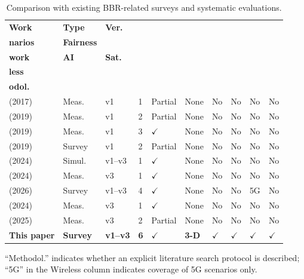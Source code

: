 \documentclass[a4paper,fleqn]{cas-sc}
\begin{document}
\begin{table}[pos=tbp]
  \caption{Comparison with existing BBR-related surveys and systematic evaluations.}
  \label{tab:survey_compare}
  \footnotesize
  \setlength{\tabcolsep}{3pt}
  \begin{tabularx}{\tblwidth}{@{}p{3.2cm}p{1.4cm}p{1.1cm}p{0.9cm}p{1.0cm}p{1.2cm}p{0.55cm}p{0.55cm}p{0.9cm}p{1.1cm}@{}}
    \toprule
    \textbf{Work} & \textbf{Type} & \textbf{Ver.} & \makecell[l]{\textbf{Sce-}\\\textbf{narios}}
      & \textbf{Fairness} & \makecell[l]{\textbf{Frame-}\\\textbf{work}} & \textbf{AI} & \textbf{Sat.}
      & \makecell[l]{\textbf{Wire-}\\\textbf{less}} & \makecell[l]{\textbf{Meth-}\\\textbf{odol.}} \\
    \midrule
    \citet{hock2017bbr} (2017) & Meas. & v1 & 1 & Partial & None & No & No & No & No \\
    \citet{cao2019bbr} (2019) & Meas. & v1 & 2 & Partial & None & No & No & No & No \\
    \citet{jaeger2019bbr} (2019) & Meas. & v1 & 3 & $\checkmark$ & None & No & No & No & No \\
    \citet{al2019survey} (2019) & Survey & v1 & 2 & Partial & None & No & No & No & No \\
    \citet{piotrowska2024} (2024) & Simul. & v1--v3 & 1 & $\checkmark$ & None & No & No & No & No \\
    \citet{gomez2024bbrv3} (2024) & Meas. & v3 & 1 & $\checkmark$ & None & No & No & No & No \\
    \citet{abrol2026bbr} (2026) & Survey & v1--v3 & 4 & $\checkmark$ & None & No & No & 5G & No \\
    \citet{zeynali2024bbrv3} (2024) & Meas. & v3 & 1 & $\checkmark$ & None & No & No & No & No \\
    \citet{bless2025insights} (2025) & Meas. & v3 & 2 & Partial & None & No & No & No & No \\
    \textbf{This paper} & \textbf{Survey} & \textbf{v1--v3} & \textbf{6}
      & $\checkmark$ & \textbf{3-D} & $\checkmark$ & $\checkmark$ & $\checkmark$ & $\checkmark$ \\
    \bottomrule
  \end{tabularx}
  \begin{tablenotes}
    \small
    \item ``Methodol.'' indicates whether an explicit literature search protocol is described;
    ``5G'' in the Wireless column indicates coverage of 5G scenarios only.
  \end{tablenotes}
\end{table}
\end{document}
